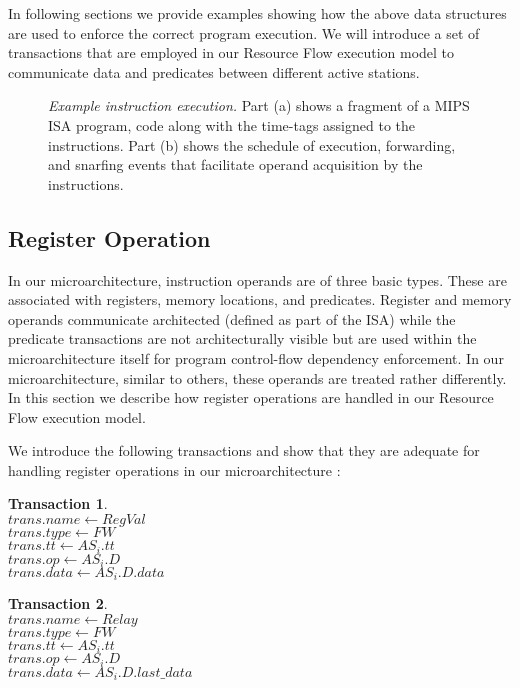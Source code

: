 \documentclass[10pt,twocolumn]{IEEEtran}
\newtheorem{trans}{Transaction}
\begin{document}
In following sections we provide examples showing how the
above data structures are used to enforce the correct program execution.
We will introduce a set of transactions that are employed in our Resource
Flow execution model to
communicate data and predicates between different active stations.
%
\begin{figure*}[th]
\centering
{}
\caption{{\em Example instruction execution.}
Part (a) shows a fragment of a MIPS ISA program, code along with the
time-tags assigned to the instructions.
Part (b) shows the schedule of execution, forwarding, and snarfing
events that facilitate operand acquisition by the instructions.}
\label{fig:ttexample}
\end{figure*}
%
%
\subsection{Register Operation}
\label{sec:regop}
%
In our microarchitecture, instruction operands are of three basic
types.  These are associated with registers, memory locations,
and predicates.  Register and memory operands communicate architected
(defined as part of the ISA) while the predicate transactions
are not architecturally visible but are used within the microarchitecture
itself for program control-flow dependency enforcement.
In our microarchitecture, similar to others,
these operands are treated rather differently. 
In this section we describe
how register operations are handled in our Resource Flow execution model.

We introduce the following transactions and show that they are
adequate for handling register operations in our
microarchitecture :

\begin{trans}
\mbox{} \\
\indent $trans.name \leftarrow RegVal $ \\
\indent $trans.type \leftarrow FW $ \\
\indent $trans.tt \leftarrow AS_i.tt$ \\
\indent $trans.op \leftarrow AS_i.D $ \\
\indent $trans.data \leftarrow AS_i.D.data $
\end{trans}

\begin{trans}
\mbox{} \\
\indent $trans.name \leftarrow Relay$ \\
\indent $trans.type \leftarrow FW$ \\
\indent $trans.tt \leftarrow AS_i.tt$ \\
\indent $trans.op \leftarrow AS_i.D $ \\
\indent $trans.data \leftarrow AS_i.D.last\_data $
\end{trans}
\end{document}
